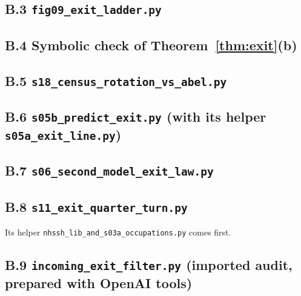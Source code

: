 \documentclass[11pt]{article}
\theoremstyle{definition}
\begin{document}
\subsection*{B.3 \texttt{fig09\_exit\_ladder.py}}

\subsection*{B.4 Symbolic check of Theorem~\ref{thm:exit}(b)}


\subsection*{B.5 \texttt{s18\_census\_rotation\_vs\_abel.py}}


\subsection*{B.6 \texttt{s05b\_predict\_exit.py} (with its helper \texttt{s05a\_exit\_line.py})}



\subsection*{B.7 \texttt{s06\_second\_model\_exit\_law.py}}


\subsection*{B.8 \texttt{s11\_exit\_quarter\_turn.py}}\noindent Its helper \texttt{nhssh\_lib\_and\_s03a\_occupations.py} comes first.



\subsection*{B.9 \texttt{incoming\_exit\_filter.py} (imported audit, prepared with OpenAI tools)}


\end{document}
